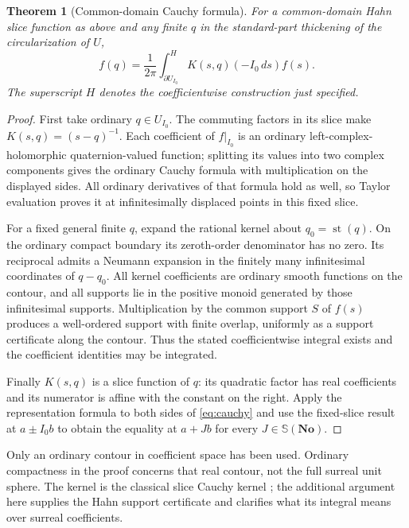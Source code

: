 \documentclass[11pt,letterpaper]{article}
\numberwithin{equation}{section}
\newtheorem{theorem}{Theorem}[section]
\theoremstyle{definition}
\theoremstyle{remark}
\newcommand{\No}{\mathbf{No}}
\newcommand{\st}{\operatorname{st}}
\begin{document}
\begin{theorem}[Common-domain Cauchy formula]\label{thm:cauchy}
For a common-domain Hahn slice function as above and any finite $q$ in the standard-part
thickening of the circularization of $U$,
\begin{equation}\label{eq:cauchy}
 f(q)=\frac1{2\pi}\int_{\partial U_{I_0}}^{\!H}
 K(s,q)(-I_0\,ds)f(s).
\end{equation}
The superscript $H$ denotes the coefficientwise construction just specified.
\end{theorem}
\begin{proof}
First take ordinary $q\in U_{I_0}$. The commuting factors in its slice make
$K(s,q)=(s-q)^{-1}$. Each coefficient of $f|_{I_0}$ is an ordinary left-complex-holomorphic
quaternion-valued function; splitting its values into two complex components gives the
ordinary Cauchy formula with multiplication on the displayed sides. All ordinary derivatives
of that formula hold as well, so Taylor evaluation proves it at infinitesimally displaced
points in this fixed slice.

For a fixed general finite $q$, expand the rational kernel about $q_0=\st(q)$. On the
ordinary compact boundary its zeroth-order denominator has no zero. Its reciprocal admits
a Neumann expansion in the finitely many infinitesimal coordinates of $q-q_0$. All kernel
coefficients are ordinary smooth functions on the contour, and all supports lie in the
positive monoid generated by those infinitesimal supports. Multiplication by the common
support $S$ of $f(s)$ produces a well-ordered support with finite overlap, uniformly as a
support certificate along the contour. Thus the stated coefficientwise integral exists and
the coefficient identities may be integrated.

Finally $K(s,q)$ is a slice function of $q$: its quadratic factor has real coefficients and
its numerator is affine with the constant on the right. Apply the representation formula
to both sides of \eqref{eq:cauchy} and use the fixed-slice result at $a\pm I_0b$ to obtain
the equality at $a+Jb$ for every $J\in\mathbb S(\No)$.
\end{proof}

Only an ordinary contour in coefficient space has been used. Ordinary compactness in the
proof concerns that real contour, not the full surreal unit sphere. The kernel is the
classical slice Cauchy kernel \cite{GP}; the additional argument here supplies the Hahn
support certificate and clarifies what its integral means over surreal coefficients.
\end{document}

